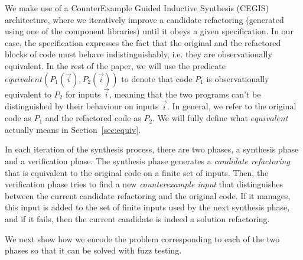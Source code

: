 \documentclass[10pt,conference]{IEEEtran}
\begin{document}



We make use of a CounterExample Guided Inductive Synthesis (CEGIS)~\cite{DBLP:conf/pldi/Solar-LezamaJB08} architecture, where we
iteratively improve a candidate refactoring (generated using one of the component libraries) until it obeys a given specification.
In our case, the specification expresses the fact that the original and
the refactored blocks of code must behave indistinguishably, i.e. they are observationally equivalent.
%
In the rest of the paper, we will use the predicate
$equivalent(P_1(\vec{i}), P_2(\vec{i}))$ to denote that code $P_1$ is
observationally equivalent to $P_2$ for inputs $\vec{i}$, meaning that the two programs
can't be distinguished by their behaviour on inputs $\vec{i}$.  In general,
we refer to the original code as $P_1$ and the refactored code as
$P_2$. We will fully define what $equivalent$ actually means in Section~\ref{sec:equiv}.

In each iteration of the synthesis process, there are two phases, a synthesis phase and a verification phase. The synthesis phase generates a {\em candidate refactoring} that is equivalent to
the original code on a finite set of inputs. Then, the verification phase tries to find a new {\em counterexample input} that distinguishes between the current candidate refactoring and the original code. If it manages, this input is added to the set of finite inputs used by the next synthesis phase, and if it fails, then the current candidate is indeed a solution refactoring.

We next show how we encode the problem corresponding to each of the two phases so that it can be solved with fuzz testing. 
\end{document}
